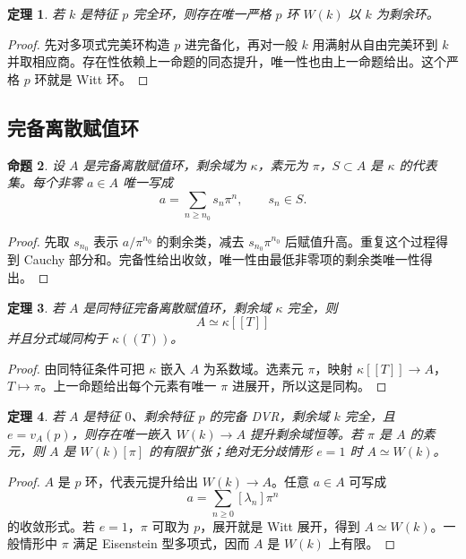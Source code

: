 \documentclass[11pt,a4paper,openany]{ctexbook}
\numberwithin{equation}{chapter}
\theoremstyle{plain}
\newtheorem{theorem}{定理}[chapter]
\newtheorem{proposition}[theorem]{命题}
\theoremstyle{definition}
\theoremstyle{remark}
\begin{document}
\begin{theorem}
若 $k$ 是特征 $p$ 完全环，则存在唯一严格 $p$ 环 $W(k)$ 以 $k$ 为剩余环。
\end{theorem}

\begin{proof}
先对多项式完美环构造 $p$ 进完备化，再对一般 $k$ 用满射从自由完美环到 $k$ 并取相应商。存在性依赖上一命题的同态提升，唯一性也由上一命题给出。这个严格 $p$ 环就是 Witt 环。
\end{proof}

\subsection{完备离散赋值环}

\begin{proposition}
设 $A$ 是完备离散赋值环，剩余域为 $\kappa$，素元为 $\pi$，$S\subset A$ 是 $\kappa$ 的代表集。每个非零 $a\in A$ 唯一写成
\[
  a=\sum_{n\ge n_0}s_n\pi^n,\qquad s_n\in S.
\]
\end{proposition}

\begin{proof}
先取 $s_{n_0}$ 表示 $a/\pi^{n_0}$ 的剩余类，减去 $s_{n_0}\pi^{n_0}$ 后赋值升高。重复这个过程得到 Cauchy 部分和。完备性给出收敛，唯一性由最低非零项的剩余类唯一性得出。
\end{proof}

\begin{theorem}
若 $A$ 是同特征完备离散赋值环，剩余域 $\kappa$ 完全，则
\[
  A\simeq \kappa[[T]]
\]
并且分式域同构于 $\kappa((T))$。
\end{theorem}

\begin{proof}
由同特征条件可把 $\kappa$ 嵌入 $A$ 为系数域。选素元 $\pi$，映射 $\kappa[[T]]\to A$，$T\mapsto\pi$。上一命题给出每个元素有唯一 $\pi$ 进展开，所以这是同构。
\end{proof}

\begin{theorem}
若 $A$ 是特征 $0$、剩余特征 $p$ 的完备 DVR，剩余域 $k$ 完全，且 $e=v_A(p)$，则存在唯一嵌入 $W(k)\to A$ 提升剩余域恒等。若 $\pi$ 是 $A$ 的素元，则 $A$ 是 $W(k)[\pi]$ 的有限扩张；绝对无分歧情形 $e=1$ 时 $A\simeq W(k)$。
\end{theorem}

\begin{proof}
$A$ 是 $p$ 环，代表元提升给出 $W(k)\to A$。任意 $a\in A$ 可写成
\[
  a=\sum_{n\ge0}[\lambda_n]\pi^n
\]
的收敛形式。若 $e=1$，$\pi$ 可取为 $p$，展开就是 Witt 展开，得到 $A\simeq W(k)$。一般情形中 $\pi$ 满足 Eisenstein 型多项式，因而 $A$ 是 $W(k)$ 上有限。
\end{proof}
\end{document}
